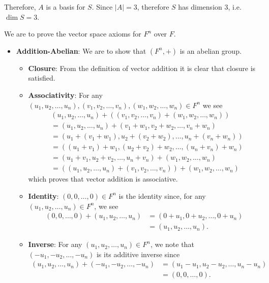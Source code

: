 \begin{questions}
\begin{partquestions}{\alph*}
        Therefore, $A$ is a basis for $S$. Since $|A| = 3$, therefore $S$ has dimension 3, i.e. $\dim{S} = 3$.
    \end{partquestions}

    \item We are to prove the vector space axioms for $F^n$ over $F$.
    \begin{itemize}
        \item \textbf{Addition-Abelian}: We are to show that $(F^n, +)$ is an abelian group.
        \begin{itemize}
            \item \textbf{Closure}: From the definition of vector addition it is clear that closure is satisfied.

            \item \textbf{Associativity}: For any $(u_1, u_2, \dots, u_n), (v_1, v_2, \dots, v_n), (w_1, w_2, \dots, w_n) \in F^n$ we see
            \begin{align*}
                &(u_1, u_2, \dots, u_n) + ((v_1, v_2, \dots, v_n) + (w_1, w_2, \dots, w_n))\\
                &= (u_1, u_2, \dots, u_n) + (v_1 + w_1, v_2 + w_2, \dots, v_n + w_n)\\
                &= (u_1 + (v_1 + w_1), u_2 + (v_2 + w_2), \dots, u_n + (v_n + w_n))\\
                &= ((u_1 + v_1) + w_1, (u_2 + v_2) + w_2, \dots, (u_n + v_n) + w_n)\\
                &= (u_1 + v_1, u_2 + v_2, \dots, u_n + v_n) + (w_1, w_2, \dots, w_n)\\
                &= ((u_1, u_2, \dots, u_n) + (v_1, v_2, \dots, v_n)) + (w_1, w_2, \dots, w_n)
            \end{align*}
            which proves that vector addition is associative.

            \item \textbf{Identity}: $(0, 0, \dots, 0) \in F^n$ is the identity since, for any $(u_1, u_2, \dots, u_n) \in F^n$, we see
            \begin{align*}
                (0, 0, \dots, 0) + (u_1, u_2, \dots, u_n) &= (0 + u_1, 0 + u_2, \dots, 0 + u_n)\\
                &= (u_1, u_2, \dots, u_n).
            \end{align*}

            \item \textbf{Inverse}: For any $(u_1, u_2, \dots, u_n) \in F^n$, we note that $(-u_1, -u_2, \dots, -u_n)$ is its additive inverse since
            \begin{align*}
                (u_1, u_2, \dots, u_n) + (-u_1, -u_2, \dots, -u_n) &= (u_1 - u_1, u_2 - u_2, \dots, u_n - u_n)\\
                &= (0, 0, \dots, 0).
            \end{align*}


\end{itemize}
\end{itemize}
\end{questions}
